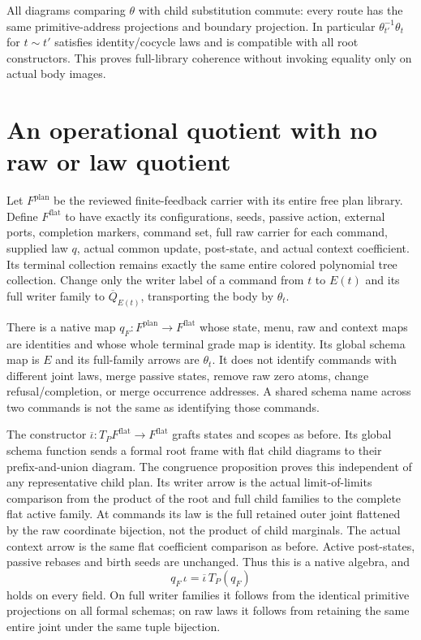 \documentclass[11pt]{article}
\begin{document}
All diagrams comparing $\theta$ with child substitution commute: every route has the same primitive-address projections and boundary projection. In particular $\theta_{t'}^{-1}\theta_t$ for $t\sim t'$ satisfies identity/cocycle laws and is compatible with all root constructors. This proves full-library coherence without invoking equality only on actual body images.

\section{An operational quotient with no raw or law quotient}
Let $F^{\mathrm{plan}}$ be the reviewed finite-feedback carrier with its entire free plan library. Define $F^{\mathrm{flat}}$ to have exactly its configurations, seeds, passive action, external ports, completion markers, command set, full raw carrier for each command, supplied law $q$, actual common update, post-state, and actual context coefficient. Its terminal collection remains exactly the same entire colored polynomial tree collection. Change only the writer label of a command from $t$ to $E(t)$ and its full writer family to $\overline Q_{E(t)}$, transporting the body by $\theta_t$.

There is a native map $q_F:F^{\mathrm{plan}}\to F^{\mathrm{flat}}$ whose state, menu, raw and context maps are identities and whose whole terminal grade map is identity. Its global schema map is $E$ and its full-family arrows are $\theta_t$. It does not identify commands with different joint laws, merge passive states, remove raw zero atoms, change refusal/completion, or merge occurrence addresses. A shared schema name across two commands is not the same as identifying those commands.

The constructor $\overline\iota:T_PF^{\mathrm{flat}}\to F^{\mathrm{flat}}$ grafts states and scopes as before. Its global schema function sends a formal root frame with flat child diagrams to their prefix-and-union diagram. The congruence proposition proves this independent of any representative child plan. Its writer arrow is the actual limit-of-limits comparison from the product of the root and full child families to the complete flat active family. At commands its law is the full retained outer joint flattened by the raw coordinate bijection, not the product of child marginals. The actual context arrow is the same flat coefficient comparison as before. Active post-states, passive rebases and birth seeds are unchanged. Thus this is a native algebra, and
\[
 q_F\,\iota=\overline\iota\,T_P(q_F)
\]
holds on every field. On full writer families it follows from the identical primitive projections on all formal schemas; on raw laws it follows from retaining the same entire joint under the same tuple bijection.
\end{document}
